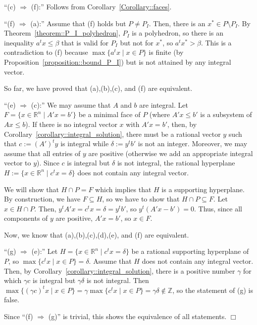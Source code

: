 \documentclass[12pt, showidx, twoside]{article}
\def\endproof{\hfill{$\Box$}}
\def\R{\mathbb{R}}
\def\Z{\mathbb{Z}}
\begin{document}
{{{``(c) $\Rightarrow$ (f):'' Follows from Corollary~\ref{Corollary::faces}.

``(f) $\Rightarrow$ (a):'' Assume that (f) holds but $P \neq P_I$. Then, there is an
   $x^* \in P \setminus P_I$. By Theorem~\ref{theorem::P_I_polyhedron}, $P_I$ is a
   polyhedron, so there is an inequality $a^t x \leq \beta$ that is valid for 
   $P_I$ but not for $x^*$, so $a^t x^* > \beta$. This is a contradiction to (f)
   because $\max\{ a^tx \mid x \in P \}$ is finite 
   (by Proposition~\ref{proposition::bound_P_I}) but is not attained by any integral
   vector.

So far, we have proved that (a),(b),(c), and (f) are equivalent.

``(e) $\Rightarrow$ (c):'' We may assume that $A$ and $b$ are integral.
Let $F = \{x \in \R^n \mid A' x = b'\}$ be a minimal face of $P$
(where $A'x \leq b'$ is a subsystem of $Ax \leq b$). If there is no
integral vector $x$ with $A' x = b'$, then, by 
Corollary~\ref{corollary::integral_solution}, there must be a rational
vector $y$ such that $c:= (A')^t y$ is integral while $\delta := y^t b'$
is not an integer. Moreover, we may assume that all entries of $y$ 
are positive (otherwise we add an appropriate integral vector to $y$).
Since $c$ is integral but $\delta$ is not integral, the rational hyperplane
$H := \{x \in \R^n \mid c^t x = \delta\}$ does not contain any integral vector.

We will show that $H \cap P = F$ which implies that 
$H$ is a supporting hyperplane. 
By construction, we have $F \subseteq H$, so we have to show that
$H \cap P \subseteq F$. Let $x \in H \cap P$. 
Then, $y^t A' x = c^t x = \delta = y^t b'$, so $y^t(A' x - b') = 0$.
Thus, since all components of $y$ are positive,  $A'x = b'$, so
$x \in F$.

Now, we know that (a),(b),(c),(d),(e), and (f) are equivalent.

``(g) $\Rightarrow$ (e):'' Let $H = \{x \in \R^n \mid c^t x = \delta\}$
be a rational supporting hyperplane of $P$, so 
$\max\{ c^t x \mid x \in P \} = \delta$. Assume that $H$ does not contain
any integral vector. Then, by Corollary~\ref{corollary::integral_solution},
there is a positive number $\gamma$ for which $\gamma c$ is integral but $\gamma \delta$
is not integral. Then $\max\{  (\gamma c)^t x \mid x \in P\} 
= \gamma \max\{c^t x \mid x \in P\} = \gamma \delta \not\in \Z$, so
the statement of (g) is false.

Since ``(f) $\Rightarrow$ (g)'' is trivial, this shows the equivalence
of all statements.
\endproof

}}}
\end{document}
